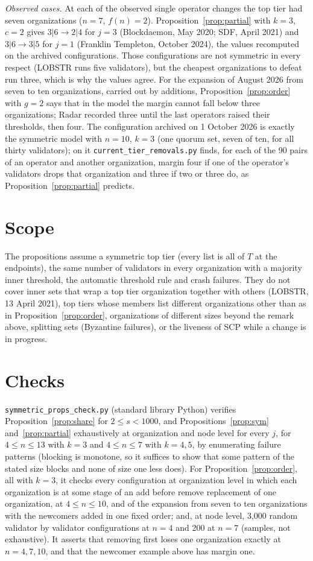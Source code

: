 \documentclass[11pt,a4paper]{article}
\begin{document}
\emph{Observed cases.} At each of the observed single operator changes the top tier had seven organizations ($n=7$, $f(n)=2$). Proposition~\ref{prop:partial} with $k=3$, $c=2$ gives $3|6\to2|4$ for $j=3$ (Blockdaemon, May 2020; SDF, April 2021) and $3|6\to3|5$ for $j=1$ (Franklin Templeton, October 2024), the values recomputed on the archived configurations. Those configurations are not symmetric in every respect (LOBSTR runs five validators), but the cheapest organizations to defeat run three, which is why the values agree. For the expansion of August 2026 from seven to ten organizations, carried out by additions, Proposition~\ref{prop:order} with $g=2$ says that in the model the margin cannot fall below three organizations; Radar recorded three until the last operators raised their thresholds, then four. The configuration archived on 1 October 2026 is exactly the symmetric model with $n=10$, $k=3$ (one quorum set, seven of ten, for all thirty validators); on it \texttt{current\_tier\_removals.py} finds, for each of the 90 pairs of an operator and another organization, margin four if one of the operator's validators drops that organization and three if two or three do, as Proposition~\ref{prop:partial} predicts.

\section*{Scope}
The propositions assume a symmetric top tier (every list is all of $T$ at the endpoints), the same number of validators in every organization with a majority inner threshold, the automatic threshold rule and crash failures. They do not cover inner sets that wrap a top tier organization together with others (LOBSTR, 13 April 2021), top tiers whose members list different organizations other than as in Proposition~\ref{prop:order}, organizations of different sizes beyond the remark above, splitting sets (Byzantine failures), or the liveness of SCP while a change is in progress.

\section*{Checks}
\texttt{symmetric\_props\_check.py} (standard library Python) verifies Proposition~\ref{prop:share} for $2\le s<1000$, and Propositions~\ref{prop:sym} and~\ref{prop:partial} exhaustively at organization and node level for every $j$, for $4\le n\le 13$ with $k=3$ and $4\le n\le 7$ with $k=4,5$, by enumerating failure patterns (blocking is monotone, so it suffices to show that some pattern of the stated size blocks and none of size one less does). For Proposition~\ref{prop:order}, all with $k=3$, it checks every configuration at organization level in which each organization is at some stage of an add before remove replacement of one organization, at $4\le n\le 10$, and of the expansion from seven to ten organizations with the newcomers added in one fixed order; and, at node level, 3,000 random validator by validator configurations at $n=4$ and 200 at $n=7$ (samples, not exhaustive). It asserts that removing first loses one organization exactly at $n=4,7,10$, and that the newcomer example above has margin one.
\end{document}
